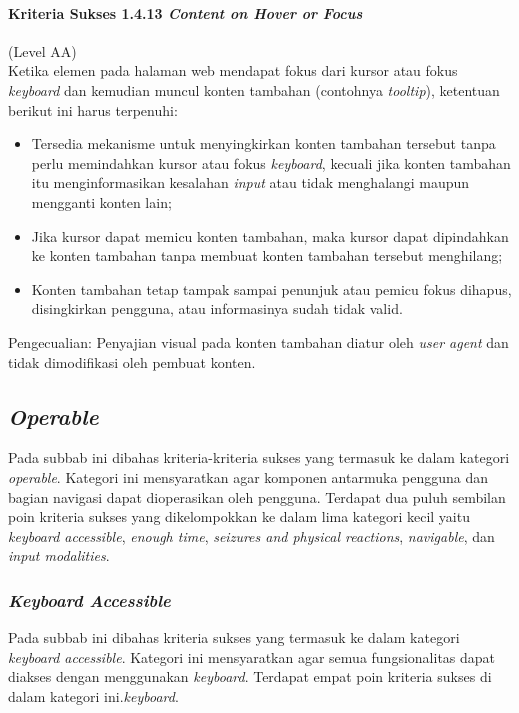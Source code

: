 \paragraph{Kriteria Sukses 1.4.13 \textit{Content on Hover or Focus}}
\label{sec:kriteria_sukses_1.4.13}
(Level AA)\\

Ketika elemen pada halaman web mendapat fokus dari kursor atau fokus \textit{keyboard} dan kemudian muncul konten tambahan (contohnya \textit{tooltip}), ketentuan berikut ini harus terpenuhi:

\begin{itemize}
	\item Tersedia mekanisme untuk menyingkirkan konten tambahan tersebut tanpa perlu memindahkan kursor atau fokus \textit{keyboard}, kecuali jika konten tambahan itu menginformasikan kesalahan \textit{input} atau tidak menghalangi maupun mengganti konten lain;
	\item Jika kursor dapat memicu konten tambahan, maka kursor dapat dipindahkan ke konten tambahan tanpa membuat konten tambahan tersebut menghilang;
	\item Konten tambahan tetap tampak sampai penunjuk atau pemicu fokus dihapus, disingkirkan pengguna, atau informasinya sudah tidak valid.
\end{itemize}

Pengecualian: Penyajian visual pada konten tambahan diatur oleh \textit{user agent} dan tidak dimodifikasi oleh pembuat konten.



\subsection{\textit{Operable}}
\label{sec:operable}
Pada subbab ini dibahas kriteria-kriteria sukses yang termasuk ke dalam kategori \textit{operable}. Kategori ini mensyaratkan agar komponen antarmuka pengguna dan bagian navigasi dapat dioperasikan oleh pengguna. Terdapat dua puluh sembilan poin kriteria sukses yang dikelompokkan ke dalam lima kategori kecil yaitu \textit{keyboard accessible}, \textit{enough time}, \textit{seizures and physical reactions}, \textit{navigable}, dan \textit{input modalities}.

\subsubsection{\textit{Keyboard Accessible}}
\label{sec:keyboard_accessible}
Pada subbab ini dibahas kriteria sukses yang termasuk ke dalam kategori \textit{keyboard accessible}. Kategori ini mensyaratkan agar semua fungsionalitas dapat diakses dengan menggunakan \textit{keyboard}. Terdapat empat poin kriteria sukses di dalam kategori ini.\textit{keyboard}.

